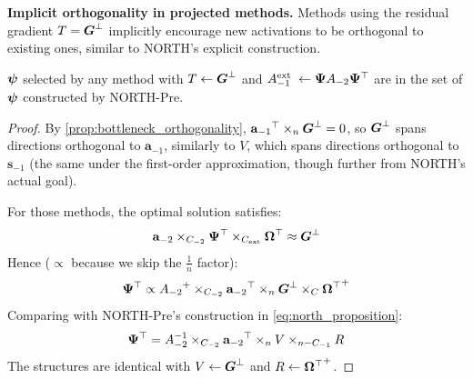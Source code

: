 \begin{proposition}\label{prop:north_satisfaction}

\textbf{Implicit orthogonality in projected methods.} Methods using the
residual gradient \(T = {\boldsymbol{G}^\perp}\) implicitly encourage new
activations to be orthogonal to existing ones, similar to NORTH's
explicit construction.

\end{proposition}

\begin{proposition}

\(\boldsymbol{\psi}{}\) selected by any method with \(T \leftarrow {\boldsymbol{G}^\perp}\)
and \(A_{- 1}^{\text{ext }} \leftarrow \boldsymbol{\Psi}{}A_{- 2}\boldsymbol{\Psi}{}^{\top}\)
are in the set of \(\boldsymbol{\psi}{}\) constructed by NORTH-Pre.

\end{proposition}

\begin{proof}

By \autoref{prop:bottleneck_orthogonality},
\({\mathbf{a}_{- 1}}^{\top} \times_{n}{\boldsymbol{G}^\perp} = 0\), so
\({\boldsymbol{G}^\perp}\) spans directions orthogonal to \(\mathbf{a}_{- 1}\),
similarly to \(V\), which spans directions orthogonal to
\(\mathbf{s}_{- 1}\) (the same under the first-order approximation,
though further from NORTH's actual goal).

For those methods, the optimal solution satisfies:
\[\mathbf{a}_{- 2} \times_{C_{- 2}}\boldsymbol{\Psi}{}^{\top} \times_{C_{\text{ext}}}\boldsymbol{\Omega}{}^{\top} \approx {\boldsymbol{G}^\perp}\]
Hence (\(\propto\) because we skip the \(\frac{1}{n}\) factor):
\[\boldsymbol{\Psi}{}^{\top} \propto {A_{- 2}}^{+} \times_{C_{- 2}}{\mathbf{a}_{- 2}}^{\top} \times_{n}{\boldsymbol{G}^\perp} \times_{C}{\boldsymbol{\Omega}{}^{\top}}^{+}\]
Comparing with NORTH-Pre's construction in \autoref{eq:north_proposition}:
\[\boldsymbol{\Psi}{}^{\top} = A_{- 2}^{- 1} \times_{C_{- 2}}{\mathbf{a}_{- 2}}^{\top} \times_{n}V \times_{n - C_{- 1}}R\]
The structures are identical with \(V \leftarrow {\boldsymbol{G}^\perp}\) and
\(R \leftarrow {\boldsymbol{\Omega}{}^{\top}}^{+}\).

\end{proof}


